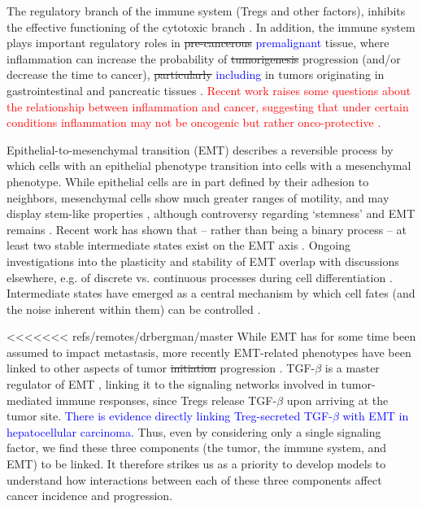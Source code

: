 \documentclass[11pt]{article}
\newcommand{\tcr} { \textcolor{red} }
\newcommand{\tcb} { \textcolor{blue} }
\begin{document}
The regulatory branch of the immune system (Tregs and other factors), inhibits the effective functioning of the cytotoxic branch \cite{ruffell2010lymphocytes}.
In addition, the immune system plays important regulatory roles in \sout{pre-cancerous} \tcb{premalignant} tissue, where inflammation can increase the probability of \sout{tumorigenesis} progression (and/or decrease the time to cancer), \sout{particularly} \tcb{including} in tumors originating in gastrointestinal and pancreatic tissues \cite{hu10_inflammationinduced, balkwill01_inflammation}.
\tcr{Recent work raises some questions about the relationship between inflammation and cancer, suggesting that under certain conditions inflammation may not be oncogenic but rather onco-protective \cite{guo17_multiscale}.}
\par
Epithelial-to-mesenchymal transition (EMT) describes a reversible process by which cells with an epithelial phenotype transition into cells with a mesenchymal phenotype.
While epithelial cells are in part defined by their adhesion to neighbors, mesenchymal cells show much greater ranges of motility, and may display stem-like properties \cite{nieto2016emt}, although controversy regarding `stemness' and EMT remains \cite{nie18_stem, sha19_intermediate}.  
Recent work has shown that -- rather than being a binary process -- at least two stable intermediate states exist on the EMT axis \cite{hong2015ovol2, jolly15_coupling}.
Ongoing investigations into the plasticity and stability of EMT overlap with discussions elsewhere, e.g. of discrete vs. continuous processes during cell differentiation \cite{moris16_transition}.
Intermediate states have emerged as a central mechanism by which cell fates (and the noise inherent within them) can be controlled \cite{maclean18_exploring, ta16_controlling, rackauckas18_meanindependent}. 
\par 
<<<<<<< refs/remotes/drbergman/master
While EMT has for some time been assumed to impact metastasis, more recently EMT-related phenotypes have been linked to other aspects of tumor \sout{initiation} \tcb{\cite{puisieux2014oncogenic}} progression \cite{nieto2016emt}\tcb{\cite{peinado2007snail}}.
TGF-$\beta$ is a master regulator of EMT \cite{lim2012epithelial}, linking it to the signaling networks involved in tumor-mediated immune responses, since Tregs release TGF-$\beta$ upon arriving at the tumor site\cite{terry2017new}. 
\tcb{There is evidence directly linking Treg-secreted TGF-$\beta$ with EMT in hepatocellular carcinoma\cite{shi2019cd4+}.}
Thus, even by considering only a single signaling factor, we find these three components (the tumor, the immune system, and EMT) to be linked. It therefore strikes us as a priority to develop models to understand how interactions between each of these three components affect cancer incidence and progression.
\end{document}
